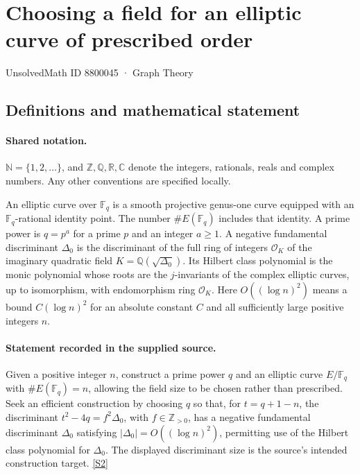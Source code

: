 \documentclass[11pt]{article}
\newcommand{\sref}[2]{\hyperlink{source:#1:#2}{[S#2]}}
\begin{document}
\setcounter{section}{8800044}
\section{Choosing a field for an elliptic curve of prescribed order}\label{8800045}
{\small\sffamily UnsolvedMath ID 8800045 · Graph Theory}
\subsection{Definitions and mathematical statement}

\paragraph{Shared notation.}$\mathbb N=\{1,2,\ldots\}$, and $\mathbb Z,\mathbb Q,\mathbb R,\mathbb C$ denote the integers, rationals, reals and complex numbers. Any other conventions are specified locally.


An elliptic curve over $\mathbb F_q$ is a smooth projective genus-one curve equipped with an $\mathbb F_q$-rational identity point. The number $\#E(\mathbb F_q)$ includes that identity. A prime power is $q=p^a$ for a prime $p$ and an integer $a\ge1$. A negative fundamental discriminant $\Delta_0$ is the discriminant of the full ring of integers $\mathcal O_K$ of the imaginary quadratic field $K=\mathbb Q(\sqrt{\Delta_0})$. Its Hilbert class polynomial is the monic polynomial whose roots are the $j$-invariants of the complex elliptic curves, up to isomorphism, with endomorphism ring $\mathcal O_K$. Here $O((\log n)^2)$ means a bound $C(\log n)^2$ for an absolute constant $C$ and all sufficiently large positive integers $n$.
\paragraph{Statement recorded in the supplied source.}
Given a positive integer $n$, construct a prime power $q$ and an elliptic curve $E/\mathbb F_q$ with $\#E(\mathbb F_q)=n$, allowing the field size to be chosen rather than prescribed. Seek an efficient construction by choosing $q$ so that, for $t=q+1-n$, the discriminant $t^2-4q=f^2\Delta_0$, with $f\in\mathbb Z_{>0}$, has a negative fundamental discriminant $\Delta_0$ satisfying $|\Delta_0|=O((\log n)^2)$, permitting use of the Hilbert class polynomial for $\Delta_0$. The displayed discriminant size is the source's intended construction target. \sref{8800045}{2}
\end{document}
